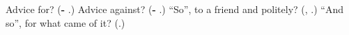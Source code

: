\begin{tcolorbox}[breakable,colback=teal!4,colframe=teal!35!black,title={Before you move on}]
Advice for? (\textbf{-  }.) Advice against? (\textbf{-  }.) \textquotedblleft{}So\textquotedblright{}, to a friend and politely? (\textbf{}, \textbf{}.) \textquotedblleft{}And so\textquotedblright{}, for what came of it? (\textbf{}.)
\end{tcolorbox}
